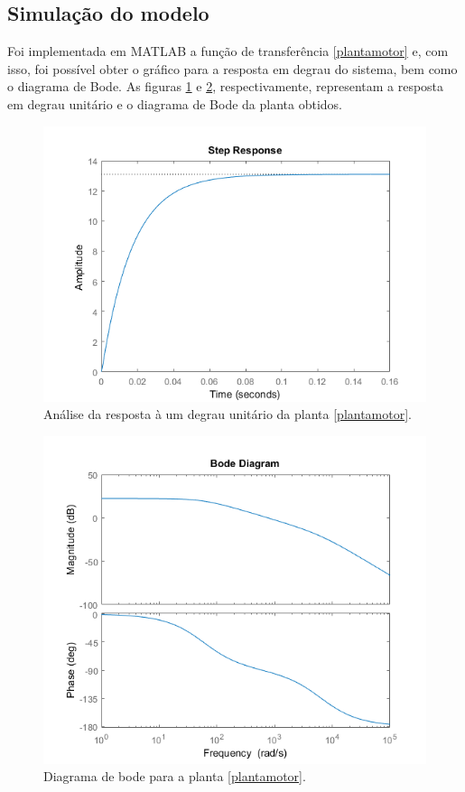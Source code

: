 \documentclass[a4paper,11pt]{article}
\begin{document}
		\newpage
		
		\subsection{Simulação do modelo}
		
		Foi implementada em MATLAB\cite{MATLAB} a função de transferência \ref{plantamotor} e, com isso, foi possível obter o gráfico para a resposta em degrau do sistema, bem como o diagrama de Bode. As figuras \ref{fig:respostaemdegrau} e \ref{fig:bode}, respectivamente, representam a resposta em degrau unitário e o diagrama de Bode da planta obtidos.
		
		\begin{figure}[ht]
			\centering
			\includegraphics[width=0.64\linewidth]{images/stepResponse}
			\caption{Análise da resposta à um degrau unitário da planta \ref{plantamotor}.}
			\label{fig:respostaemdegrau}
		\end{figure}
	
		\begin{figure}[ht]
			\centering
			\includegraphics[width=0.64\linewidth]{images/bode}
			\caption{Diagrama de bode para a planta \ref{plantamotor}.}
			\label{fig:bode}
		\end{figure}
		
\end{document}
